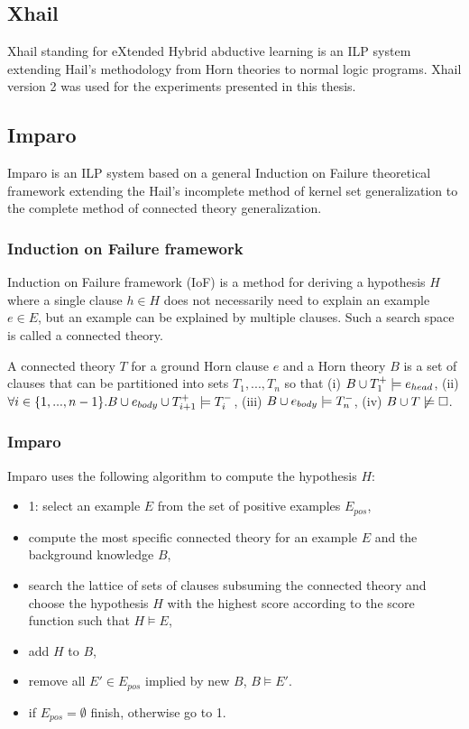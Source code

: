 \subsection{Xhail\cite{ray2009nonmonotonic}}
Xhail standing for eXtended Hybrid abductive learning is an ILP system extending Hail's methodology from Horn theories to normal logic programs.
Xhail version 2 was used for the experiments presented in this thesis.

\subsection{Imparo}\cite{kimber2012learning}
Imparo is an ILP system based on a general Induction on Failure theoretical framework extending the Hail's incomplete method of kernel set generalization to the complete method of connected theory generalization.
\subsubsection{Induction on Failure framework\cite{kimber2012learning}}
Induction on Failure framework (IoF) is a method for deriving a hypothesis $H$ where a single clause $h \in H$ does not necessarily need to explain an example $e \in E$, but an example can be explained by multiple clauses. Such a search space is called a connected theory.
\begin{defn}
A connected theory $T$ for a ground Horn clause $e$ and a Horn theory $B$ is a set of clauses that can be partitioned into sets $T_1, ..., T_n$ so that
(i) $B \cup T_1^+ \models e_{head}$,
(ii) $\forall i \in \{1, ..., n-1\}. B \cup e_{body} \cup T_{i+1}^+ \models T_i^-$,
(iii) $B \cup e_{body} \models T_n^-$,
(iv) $B \cup T \not\models \square$.
\end{defn}

\subsubsection{Imparo\cite{kimber2012learning}}
Imparo uses the following algorithm to compute the hypothesis $H$:
\begin{itemize}
\item 1: select an example $E$ from the set of positive examples $E_{pos}$,
\item compute the most specific connected theory for an example $E$ and the background knowledge $B$,
\item search the lattice of sets of clauses subsuming the connected theory and choose the hypothesis $H$ with the highest score according to the score function such that $H \models E$,
\item add $H$ to $B$,
\item remove all $E' \in E_{pos}$ implied by new $B$, $B \models E'$.
\item if $E_{pos} = \emptyset$ finish, otherwise go to 1.
\end{itemize}

